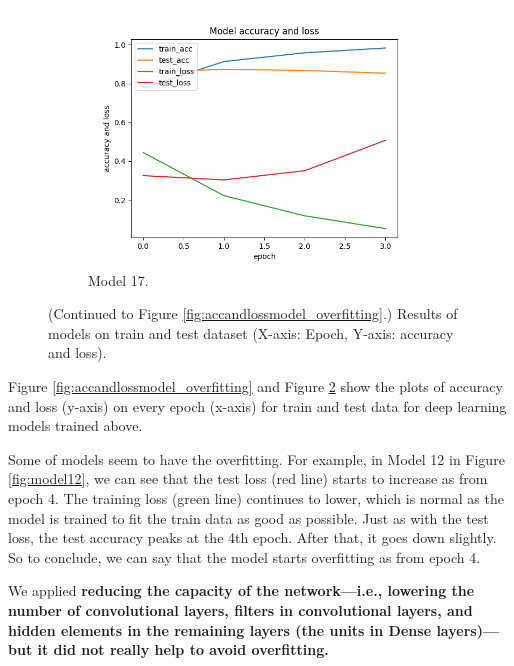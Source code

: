 \documentclass[11pt]{article}
\begin{document}
\begin{figure}[h!]
\begin{subfigure}{0.32\textwidth}
         \includegraphics[width=\textwidth]{model17.png}
         \caption{Model 17.}
         \label{fig:model17}
\end{subfigure}
\caption{(Continued to Figure \ref{fig:accandlossmodel_overfitting}.) Results of models on train and test dataset (X-axis: Epoch, Y-axis: accuracy and loss).}
\label{fig:accandlossmodel_overfitting2}
\end{figure}
Figure \ref{fig:accandlossmodel_overfitting} and Figure \ref{fig:accandlossmodel_overfitting2} show 
the plots of accuracy and loss (y-axis) on every epoch (x-axis) for train and test data for deep learning models trained above.
%

Some of models seem to have the overfitting.
%
For example, in Model 12 in Figure \ref{fig:model12}, we can see that the test loss (red line) starts to increase as from epoch 4. The training loss (green line) continues to lower, which is normal as the model is trained to fit the train data as good as possible.
%
Just as with the test loss, the test accuracy peaks at the 4th epoch. After that, it goes down slightly. So to conclude, we can say that the model starts overfitting as from epoch 4.

We applied \textbf{reducing the capacity of the network---i.e., lowering the number of convolutional layers, filters in convolutional layers, and hidden elements in the remaining layers (the units in Dense layers)---but it did not really help to avoid overfitting.}
\end{document}
